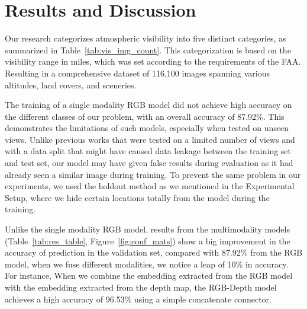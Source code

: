 \section{Results and Discussion}

Our research categorizes atmospheric visibility into five distinct categories, as summarized in Table~\ref{tab:vis_img_count}. This categorization is based on the visibility range in miles, which was set according to the requirements of the FAA. Resulting in a comprehensive dataset of 116,100 images spanning various altitudes, land covers, and sceneries.

The training of a single modality RGB model did not achieve high accuracy on the different classes of our problem, with an overall accuracy of 87.92\%. This demonstrates the limitations of such models, especially when tested on unseen views. Unlike previous works that were tested on a limited number of views and with a data split that might have caused data leakage between the training set and test set, our model may have given false results during evaluation as it had already seen a similar image during training. To prevent the same problem in our experiments, we used the holdout method as we mentioned in the Experimental Setup,  %
where we hide certain locations totally from the model during the training.






Unlike the single modality RGB model, results from the multimodality models (Table~\ref{tab:res_table}, Figure~\ref{fig:conf_mats})  show a big improvement in the accuracy of prediction in the validation set, compared with 87.92\% from the RGB model, when we fuse different modalities, we notice a leap of 10\% in accuracy. For instance, When we combine the embedding extracted from the RGB model with the embedding extracted from the depth map, the RGB-Depth model achieves a high accuracy of 96.53\% using a simple concatenate connector.



